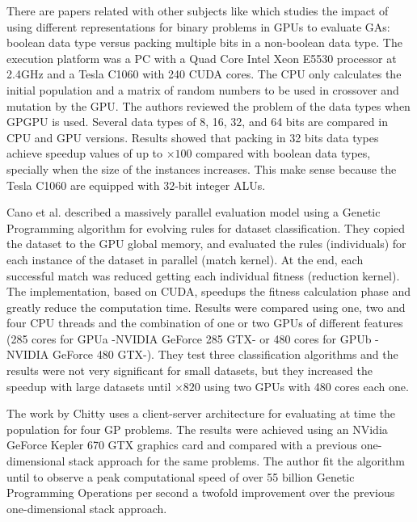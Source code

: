\documentclass{article}
\begin{document}
There are papers related with other subjects %
like \cite{Pedemonte:2011:BOG:2001858.2002031} which studies the
impact of using different representations for binary problems in GPUs
to evaluate GAs: boolean data type versus packing multiple bits in a
non-boolean data type. The execution platform was a PC with a Quad
Core Intel Xeon E5530 processor at 2.4GHz and a Tesla C1060 with 240
CUDA cores. The CPU only calculates the initial population and a
matrix of random numbers to be used in crossover and mutation by the
GPU. The authors reviewed the problem of the data types when GPGPU is
used. Several data types of 8, 16, 32, and 64 bits are compared in CPU
and GPU versions. Results showed that packing in 32 bits data types
achieve speedup values of up to $\times100$ compared with boolean data
types, specially when the size 
of the instances increases. This make sense because the Tesla C1060
are equipped with 32-bit integer ALUs.

Cano et al. \cite{SpeedingTheEvaluationofGPCano:2012} described a massively parallel evaluation model using a Genetic Programming algorithm for evolving rules for dataset classification. They copied the dataset to the GPU global memory, and evaluated the rules (individuals) for each instance of the dataset in parallel (match kernel). At the end, each successful match was reduced getting each individual fitness (reduction kernel). The implementation, based on CUDA, speedups the fitness calculation phase and greatly reduce the computation time. Results were compared using one, two and four CPU threads and the combination of one or two GPUs of different features (285 cores for GPUa -NVIDIA GeForce 285 GTX- or 480 cores for GPUb -NVIDIA GeForce 480 GTX-). They test three classification algorithms and the results were not very significant for small datasets, but they increased the speedup with large datasets until $\times820$ using two GPUs with 480 cores each one.

The work by Chitty \cite{Chitty16FastParallel} uses a client-server architecture for evaluating at time the population for four GP problems. The results were achieved using an NVidia GeForce Kepler 670 GTX graphics card and compared with a previous one-dimensional stack approach for the same problems. The author fit the algorithm until to observe a peak computational speed of over 55 billion Genetic Programming Operations per second a twofold improvement over the previous one-dimensional stack approach.
\end{document}
